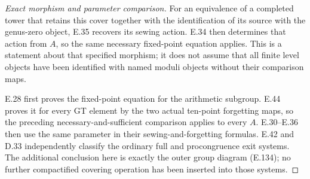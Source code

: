 \begin{proof}[Exact morphism and parameter comparison]
For an equivalence of a completed
tower that retains this cover
together with the identification
of its source with the genus-zero
object, E.35 recovers its sewing
action.  E.34 then determines that
action from $A$, so the same
necessary fixed-point equation
applies.  This is a statement
about that specified morphism;
it does not assume that all
finite level objects have been
identified with named moduli
objects without their comparison
maps.

E.28 first proves the fixed-point equation
for the arithmetic subgroup. E.44 proves
it for every GT element by the two actual
ten-point forgetting maps, so the preceding
necessary-and-sufficient comparison applies
to every $A$. E.30--E.36 then use the same
parameter in their sewing-and-forgetting
formulas. E.42 and D.33 independently
classify the ordinary full and procongruence
exit systems. The additional conclusion here
is exactly the outer group diagram (E.134);
no further compactified covering operation
has been inserted into those systems.
\end{proof}

